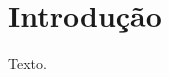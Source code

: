 \documentclass{report}
\begin{document}
\begin{abstract}
Um resumo curto.
\end{abstract}
\chapter{Introdu\c{c}\~ao}
Texto.
\end{document}
